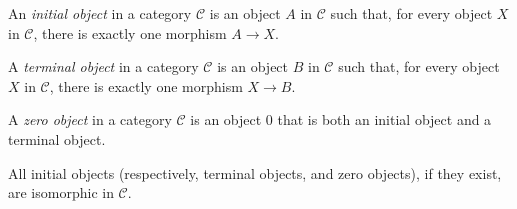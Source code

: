 \documentclass[12pt]{article}
\begin{document}
An {\em initial object} in a category $\mathcal{C}$ is an object $A$ in $\mathcal{C}$ such that, for every object $X$ in $\mathcal{C}$, there is exactly one morphism $A \longrightarrow X$.

A {\em terminal object} in a category $\mathcal{C}$ is an object $B$ in $\mathcal{C}$ such that, for every object $X$ in $\mathcal{C}$, there is exactly one morphism $X \longrightarrow B$.

A {\em zero object} in a category $\mathcal{C}$ is an object $0$ that is both an initial object and a terminal object.

All initial objects (respectively, terminal objects, and zero objects), if they exist, are isomorphic in $\mathcal{C}$.
\end{document}
